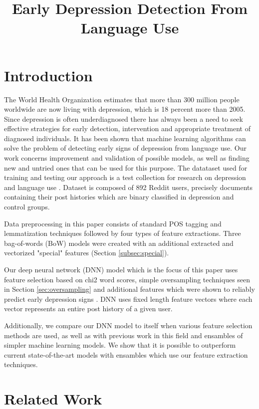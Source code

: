 \documentclass[10pt, a4paper]{article}
\title{Early Depression Detection From Language Use}
\begin{document}
\maketitleabstract

\section{Introduction}

The World Health Organization estimates that more than 300 million people worldwide are now living with depression,
 which is 18 percent more than 2005. Since depression is often underdiagnosed there has always been
 a need to seek effective strategies for early detection, intervention and appropriate treatment of diagnosed individuals.
 It has been shown that machine learning algorithms can solve the problem of detecting early signs of depression from
 language use. Our work concerns improvement and validation of possible models, as well as finding new and untried
 ones that can be used for this purpose. The datataset used for training and testing our approach is a test collection
 for research on depression and language use \cite{losada2016test}. Dataset is composed of 892 Reddit users, precisely
 documents containing their post histories which are binary classified in depression and control groups.

 Data preprocessing in this paper consists of standard POS tagging and lemmatization techniques followed by four
 types of feature extractions. Three bag-of-words (BoW) models were created with an additional extracted and vectorized
 "special" features (Section \ref{subsec:special}).

 Our deep neural network (DNN) model which is the focus of this paper uses feature selection based on chi2 word scores, simple
 oversampling techniques seen in Section \ref{sec:oversampling} and additional features which were shown to reliably predict early depression
 signs \cite{wang2013depression}. DNN uses fixed length feature vectors where each vector represents an entire post history of a given user.

 Additionally, we compare our DNN model to itself when various feature selection methods are used, as well as with previous work
 in this field and ensambles of simpler machine learning models. We show that it is possible to outperform current
 state-of-the-art models with ensambles which use our feature extraction techniques.

\section{Related Work}
\end{document}
